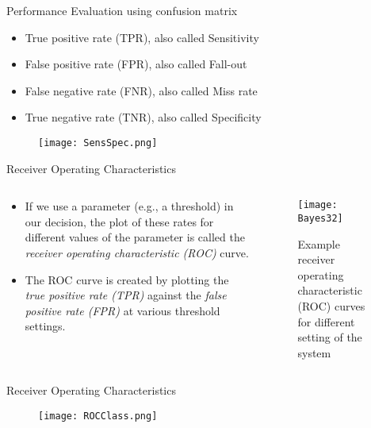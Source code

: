 \begin{frame}{Performance Evaluation using confusion matrix}
\begin{itemize}
\item True positive rate (TPR), also called Sensitivity
\item False positive rate (FPR), also called Fall-out
\item False negative rate (FNR), also called Miss rate
\item True negative rate (TNR), also called Specificity
\end{itemize}
\begin{figure}
\texttt{[image: SensSpec.png]}
\end{figure}
\end{frame}

\begin{frame}{Receiver Operating Characteristics}
\begin{columns}
\begin{column}{5cm}
\begin{itemize}
\item If we use a parameter (e.g.,
a threshold) in our
decision, the plot of these
rates for different values of
the parameter is called the
\textit{\color{mycolor2}receiver operating
characteristic (ROC)} curve.
\item The ROC curve is created by plotting the \textit{\color{mycolor2}true positive rate (TPR)} against the \textit{\color{mycolor2}false positive rate (FPR)} at various threshold settings.
\end{itemize}
\end{column}
\begin{column}{5cm}
\begin{figure}
\texttt{[image: Bayes32]}
\caption{Example receiver operating characteristic (ROC) curves for different setting of the system}
\end{figure}
\end{column}
\end{columns}
\end{frame}

\begin{frame}{Receiver Operating Characteristics}
\begin{figure}
\texttt{[image: ROCClass.png]}
\end{figure}
\end{frame}

